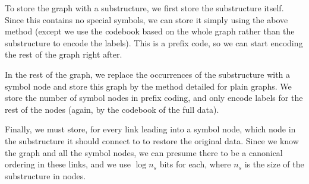 \documentclass{article}
\begin{document}
To store the graph with a substructure, we first store the substructure itself. Since this contains no special symbols, we can store it simply using the above method (except we use the codebook based on the whole graph rather than the substructure to encode the labels). This is a prefix code, so we can start encoding the rest of the graph right after.

In the rest of the graph, we replace the occurrences of the substructure with a symbol node and store this graph by the method detailed for plain graphs. We store the number of symbol nodes in prefix coding, and only encode labels for the rest of the nodes (again, by the codebook of the full data).

Finally, we must store, for every link leading into a symbol node, which node in the substructure it should connect to to restore the original data. Since we know the graph and all the symbol nodes, we can presume there to be a canonical ordering in these links, and we use $\log n_s$ bits for each, where $n_s$ is the size of the substructure in nodes.

 


 

\end{document}
